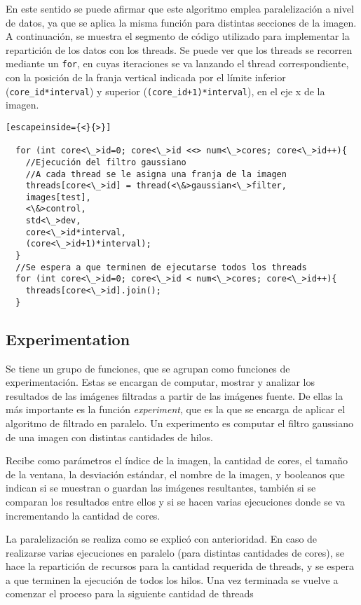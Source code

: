 \documentclass {article}
\begin{document}
En este sentido se puede afirmar que este algoritmo emplea paralelización a nivel de datos, ya que
se aplica la misma función para distintas secciones de la imagen. A continuación, se muestra el
segmento de código utilizado para implementar la repartición de los datos con los threads. Se puede
ver que los threads se recorren mediante un \texttt{for}, en cuyas iteraciones se va lanzando el
thread correspondiente, con la posición de la franja vertical indicada por el límite inferior
(\texttt{core\_id*interval}) y superior (\texttt{(core\_id+1)*interval}), en el eje x de la imagen.

\begin{lstlisting}[escapeinside={<}{>}]
  
  for (int core<\_>id=0; core<\_>id <<> num<\_>cores; core<\_>id++){
    //Ejecución del filtro gaussiano
    //A cada thread se le asigna una franja de la imagen
    threads[core<\_>id] = thread(<\&>gaussian<\_>filter,
    images[test],
    <\&>control,
    std<\_>dev,
    core<\_>id*interval,
    (core<\_>id+1)*interval);
  }
  //Se espera a que terminen de ejecutarse todos los threads
  for (int core<\_>id=0; core<\_>id < num<\_>cores; core<\_>id++){
    threads[core<\_>id].join();
  }

\end{lstlisting}


\subsection{Experimentation}

Se tiene un grupo de funciones, que se agrupan como funciones de experimentación. Estas se encargan
de computar, mostrar y analizar los resultados de las imágenes filtradas a partir de las imágenes
fuente. De ellas la más importante es la función \textit{experiment}, que es la que se encarga de
aplicar el algoritmo de filtrado en paralelo. Un experimento es computar el filtro gaussiano de una
imagen con distintas cantidades de hilos. 

Recibe como parámetros el índice de la imagen, la
cantidad de cores, el tamaño de la ventana, la desviación estándar, el nombre de la imagen, y
booleanos que indican si se muestran o guardan las imágenes resultantes, también si se comparan los
resultados entre ellos y si se hacen varias ejecuciones donde se va incrementando la cantidad de
cores.

La paralelización se realiza como se explicó con anterioridad. 
En caso de realizarse varias ejecuciones en paralelo (para distintas cantidades de cores), se hace
la repartición de recursos para la cantidad requerida de threads, y se espera a que terminen la
ejecución de todos los hilos. Una vez terminada se vuelve a comenzar el proceso para la siguiente
cantidad de threads
\end{document}
